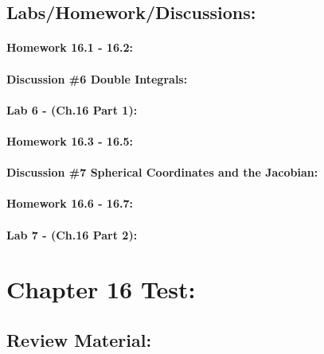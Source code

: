 \documentclass[9pt]{amsart}
\begin{document}
    \subsection{Labs/Homework/Discussions:}
        \paragraph{Homework 16.1 - 16.2:}
            

        \paragraph{Discussion \#6 Double Integrals:}
            
        \newpage
        \paragraph{Lab 6 - (Ch.16 Part 1):}
            

        \paragraph{Homework 16.3 - 16.5:}
            

        \paragraph{Discussion \#7 Spherical Coordinates and the Jacobian:}
            

        \paragraph{Homework 16.6 - 16.7:}
            
        \newpage
        \paragraph{Lab 7 - (Ch.16 Part 2):}
            

\section{Chapter 16 Test:}
    \subsection{Review Material:}
\end{document}
